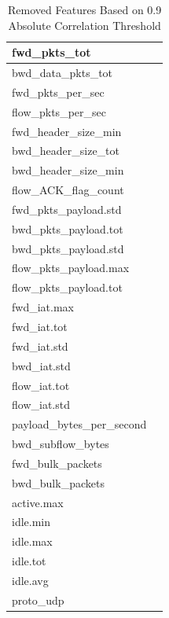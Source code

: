 \documentclass[11pt]{article}
\begin{document}
\begin{table}
  \centering
  \caption{Removed Features Based on 0.9 Absolute Correlation Threshold}
  \label{tab:table7}
  \begin{tabular}{|l|p{12cm}|}
    \hline
    fwd\_pkts\_tot\\
    \hline
    bwd\_data\_pkts\_tot\\
    \hline
    fwd\_pkts\_per\_sec\\
    \hline
    flow\_pkts\_per\_sec\\
    \hline
    fwd\_header\_size\_min\\
    \hline
    bwd\_header\_size\_tot\\
    \hline
    bwd\_header\_size\_min\\
    \hline
    flow\_ACK\_flag\_count\\
    \hline
    fwd\_pkts\_payload.std\\
    \hline
    bwd\_pkts\_payload.tot\\
    \hline
    bwd\_pkts\_payload.std\\
    \hline
    flow\_pkts\_payload.max\\
    \hline
    flow\_pkts\_payload.tot\\
    \hline
    fwd\_iat.max\\
    \hline
    fwd\_iat.tot\\
    \hline
    fwd\_iat.std\\
    \hline
    bwd\_iat.std\\
    \hline
    flow\_iat.tot\\
    \hline
    flow\_iat.std\\
    \hline
    payload\_bytes\_per\_second\\
    \hline
    bwd\_subflow\_bytes\\
    \hline
    fwd\_bulk\_packets\\
    \hline
    bwd\_bulk\_packets\\
    \hline
    active.max\\
    \hline
    idle.min\\
    \hline
    idle.max\\
    \hline
    idle.tot\\
    \hline
    idle.avg\\
    \hline
    proto\_udp\\
    \hline
  \end{tabular}
\end{table}
\end{document}

